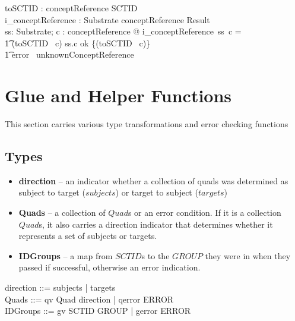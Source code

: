 \documentclass{article}
\begin{document}
\begin{gendef}
   toSCTID : conceptReference \fun SCTID \\
   i\_conceptReference : Substrate \fun conceptReference \fun Result \\
\where
   \forall ss: Substrate; c : conceptReference @ i\_conceptReference~ss~c = \\
\t1 \IF (toSCTID~ c) \in ss.c \THEN ok \{(toSCTID~ c)\} \\
\t1 \ELSE error~ unknownConceptReference
\end{gendef}

\section{Glue and Helper Functions}
This section carries various type transformations and error checking functions

\subsection{Types}

\begin{itemize}[noitemsep,nolistsep]
\item \textbf{direction} -- an indicator whether a collection of quads was determined as subject to target ($subjects$) or target to subject ($targets$)
\item \textbf{Quads} --  a collection of $Quad$s or an error condition. If it is a collection $Quad$s, it also carries
a direction indicator that determines whether it represents a set of subjects or targets. 
\item \textbf{IDGroups} -- a map from $SCTID$s to the $GROUP$ they were in when they passed if successful, otherwise an error indication.
\end{itemize}

\begin{zed}
direction ::= subjects | targets \\
Quads ::= qv \ldata \power Quad \cross direction \rdata | qerror \ldata ERROR \rdata \\
\also
IDGroups ::= gv \ldata SCTID \pfun \power GROUP \rdata | gerror \ldata ERROR \rdata
\end{zed}
\end{document}
